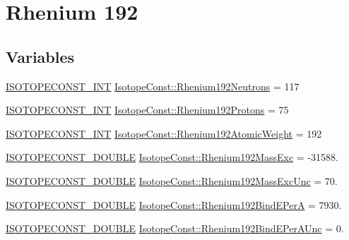 \hypertarget{group___isotope_const-_rhenium-_re192}{}\section{Rhenium 192}
\label{group___isotope_const-_rhenium-_re192}
\subsection*{Variables}
\begin{DoxyCompactItemize}
\item 
\mbox{\hyperlink{group___isotope_const-_macros_ga5f18360b3e99483a35c32d789e62621c}{I\+S\+O\+T\+O\+P\+E\+C\+O\+N\+S\+T\+\_\+\+I\+NT}} \mbox{\hyperlink{group___isotope_const-_rhenium-_re192_gabe4ded671321519e439c54f6db7f8915}{Isotope\+Const\+::\+Rhenium192\+Neutrons}} = 117
\item 
\mbox{\hyperlink{group___isotope_const-_macros_ga5f18360b3e99483a35c32d789e62621c}{I\+S\+O\+T\+O\+P\+E\+C\+O\+N\+S\+T\+\_\+\+I\+NT}} \mbox{\hyperlink{group___isotope_const-_rhenium-_re192_gae3457f15a83332fc83f89dda289eb021}{Isotope\+Const\+::\+Rhenium192\+Protons}} = 75
\item 
\mbox{\hyperlink{group___isotope_const-_macros_ga5f18360b3e99483a35c32d789e62621c}{I\+S\+O\+T\+O\+P\+E\+C\+O\+N\+S\+T\+\_\+\+I\+NT}} \mbox{\hyperlink{group___isotope_const-_rhenium-_re192_ga0f294fa19cf983bf09a7be964d0ae285}{Isotope\+Const\+::\+Rhenium192\+Atomic\+Weight}} = 192
\item 
\mbox{\hyperlink{group___isotope_const-_macros_ga8f45a7272ce02c0b4c65c44636ed719a}{I\+S\+O\+T\+O\+P\+E\+C\+O\+N\+S\+T\+\_\+\+D\+O\+U\+B\+LE}} \mbox{\hyperlink{group___isotope_const-_rhenium-_re192_ga447d87caf4ed0c49d38d9953239d0ca1}{Isotope\+Const\+::\+Rhenium192\+Mass\+Exc}} = -\/31588.
\item 
\mbox{\hyperlink{group___isotope_const-_macros_ga8f45a7272ce02c0b4c65c44636ed719a}{I\+S\+O\+T\+O\+P\+E\+C\+O\+N\+S\+T\+\_\+\+D\+O\+U\+B\+LE}} \mbox{\hyperlink{group___isotope_const-_rhenium-_re192_ga76bc1156604c7c441a1be828c80fa57f}{Isotope\+Const\+::\+Rhenium192\+Mass\+Exc\+Unc}} = 70.
\item 
\mbox{\hyperlink{group___isotope_const-_macros_ga8f45a7272ce02c0b4c65c44636ed719a}{I\+S\+O\+T\+O\+P\+E\+C\+O\+N\+S\+T\+\_\+\+D\+O\+U\+B\+LE}} \mbox{\hyperlink{group___isotope_const-_rhenium-_re192_ga4d8e7efb5fd8bf903d62fb1fc3276bd3}{Isotope\+Const\+::\+Rhenium192\+Bind\+E\+PerA}} = 7930.
\item 
\mbox{\hyperlink{group___isotope_const-_macros_ga8f45a7272ce02c0b4c65c44636ed719a}{I\+S\+O\+T\+O\+P\+E\+C\+O\+N\+S\+T\+\_\+\+D\+O\+U\+B\+LE}} \mbox{\hyperlink{group___isotope_const-_rhenium-_re192_ga537d89c80ba3e20209f6308b3e21559b}{Isotope\+Const\+::\+Rhenium192\+Bind\+E\+Per\+A\+Unc}} = 0.

\end{DoxyCompactItemize}
